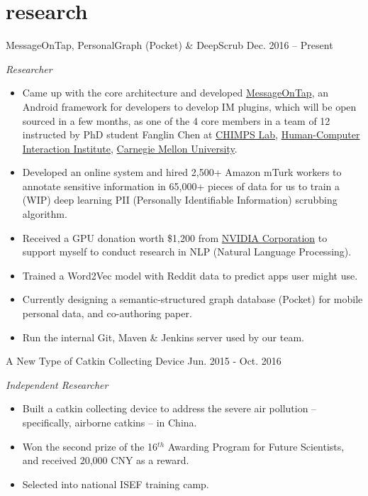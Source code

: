 \documentclass[hidelinks__VERSION__]{adamyi-cv}
\begin{document}
\pagebreak


\section{research}

\begin{entrylist}


\entry
{MessageOnTap, PersonalGraph (Pocket) \& DeepScrub}
{Dec. 2016 -- Present}
{\emph{Researcher}
\begin{itemize}
\item Came up with the core architecture and developed \href{https://github.com/MessageOnTap}{MessageOnTap}, an Android framework for developers to develop IM plugins, which will be open sourced in a few months, as one of the 4 core members in a team of 12 instructed by PhD student Fanglin Chen at \href{http://cmuchimps.org/}{CHIMPS Lab}, \href{https://www.hcii.cmu.edu/}{Human-Computer Interaction Institute}, \href{https://www.cmu.edu/}{Carnegie Mellon University}.
\item Developed an online system and hired 2,500+ Amazon mTurk workers to annotate sensitive information in 65,000+ pieces of data for us to train a (WIP) deep learning PII (Personally Identifiable Information) scrubbing algorithm.
\item Received a GPU donation worth \$1,200 from \href{https://www.nvidia.com/}{NVIDIA Corporation} to support myself to conduct research in NLP (Natural Language Processing).
\item Trained a Word2Vec model with Reddit data to predict apps user might use.
\item Currently designing a semantic-structured graph database (Pocket) for mobile personal data, and co-authoring paper.
\item Run the internal Git, Maven \& Jenkins server used by our team.
\end{itemize}}


\entry
{A New Type of Catkin Collecting Device}
{Jun. 2015 - Oct. 2016}
{\emph{Independent Researcher}
\begin{itemize}
\item Built a catkin collecting device to address the severe air pollution – specifically, airborne catkins – in China.
\item Won the second prize of the 16$^{th}$ Awarding Program for Future Scientists, and received 20,000 CNY as a reward.
\item Selected into national ISEF training camp.
\end{itemize}}


\end{entrylist}
\end{document}

